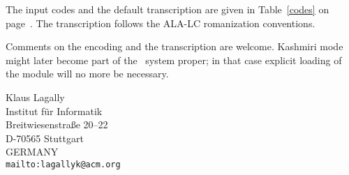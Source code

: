 \documentclass[12pt]{article}
\begin{document}
The input codes and the default transcription are given 
in Table~\ref {codes} on page~\pageref {codes}.
The transcription follows the ALA-LC romanization conventions.

Comments on the encoding and the transcription are welcome.
Kashmiri mode might later
become part of the \ArabTeX\ system proper;
in that case explicit loading of the module will no more be necessary.

\iffalse
\begin{enumerate}
\itemsep 0pt
\item 
This is a preliminary version solely
intended for inspection, experiments, evaluation, and suggestions.
The final version may differ in details, depending on feedback
by the users.

\item
Use hyphens to resolve ambiguities with aspired consonants.

\item 
If the new font is not available,
the ``wide letter kaf'' is missing.
We temporarily substitute an ordinary letter kaf with four dots,
which does not exist, but should be conspicuous enough.

\item
Tanween works as expected: \verb+miN+ <miN> , \verb+'|iN+ <'|iN> .

\item 
The user may want to break some ligatures by inserting a vertical bar,
to get the correct writing, or just for a better appearance of the script.

\end{enumerate}
\fi

\bigskip

{Klaus Lagally\\
Institut f\"ur Informatik\\
Breitwiesenstra\ss e 20--22\\
D-70565 Stuttgart\\
GERMANY\\
\tt mailto:lagallyk@acm.org}

\end{document}
